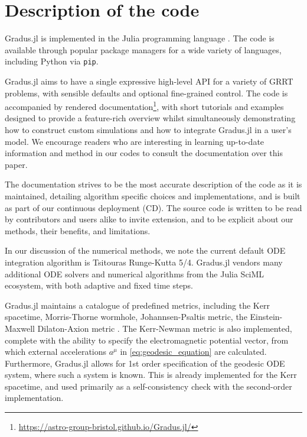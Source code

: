 \section{Description of the code}

Gradus.jl is implemented in the Julia programming language \citep{Bezanson_Julia_A_fresh_2017}. The code is available through popular package managers for a wide variety of languages, including Python via \texttt{pip}.

Gradus.jl aims to have a single expressive high-level API for a variety of GRRT problems, with sensible defaults and optional fine-grained control. The code is accompanied by rendered documentation\footnote{\url{https://astro-group-bristol.github.io/Gradus.jl/}}, with short tutorials and examples designed to provide a feature-rich overview whilst simultaneously demonstrating how to construct custom simulations and how to integrate Gradus.jl in a user's model. We encourage readers who are interesting in learning up-to-date information and method in our codes to consult the documentation over this paper. 

The documentation strives to be the most accurate description of the code as it is maintained, detailing algorithm specific choices and implementations, and is built as part of our continuous deployment (CD). The source code is written to be read by contributors and users alike to invite extension, and to be explicit about our methods, their benefits, and limitations.

In our discussion of the numerical methods, we note the current default ODE integration algorithm is Tsitouras Runge-Kutta 5/4. Gradus.jl vendors many additional ODE solvers and numerical algorithms from the Julia SciML ecosystem, with both adaptive and fixed time steps.

Gradus.jl maintains a catalogue of predefined metrics, including the Kerr spacetime, Morris-Thorne wormhole, Johannsen-Psaltis metric, the Einstein-Maxwell Dilaton-Axion metric . The Kerr-Newman metric is also implemented, complete with the ability to specify the electromagnetic potential vector, from which external accelerations $a^\mu$ in \eqref{eq:geodesic_equation} are calculated. Furthermore, Gradus.jl allows for 1st order specification of the geodesic ODE system, where such a system is known. This is already implemented for the Kerr spacetime, and used primarily as a self-consistency check with the second-order implementation.

